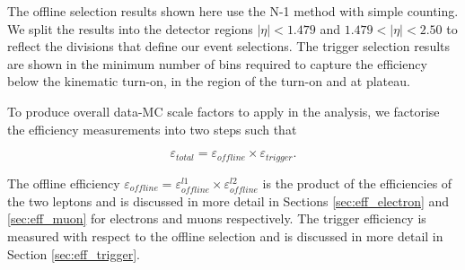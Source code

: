 


The offline selection results shown here use the N-1 method with simple counting.
We split the results into the detector regions $|\eta|<1.479$ and $1.479<|\eta|<2.50$
to reflect the divisions that define our event selections.
The trigger selection results are shown in the minimum number of bins required
to capture the efficiency below the kinematic turn-on, in the region of the turn-on
and at plateau.

To produce overall data-MC scale factors to apply in the analysis, we factorise the efficiency measurements
into two steps such that

\begin{equation}
\varepsilon_{total} = \varepsilon_{offline} \times \varepsilon_{trigger}.
\end{equation}

The offline efficiency $\varepsilon_{offline} = \varepsilon_{offline}^{l1} \times \varepsilon_{offline}^{l2}$
is the product of the efficiencies of the two leptons and is discussed in more detail in Sections \ref{sec:eff_electron}
and \ref{sec:eff_muon} for electrons and muons respectively.
The trigger efficiency is measured with respect to the offline selection and
is discussed in more detail in Section \ref{sec:eff_trigger}.

